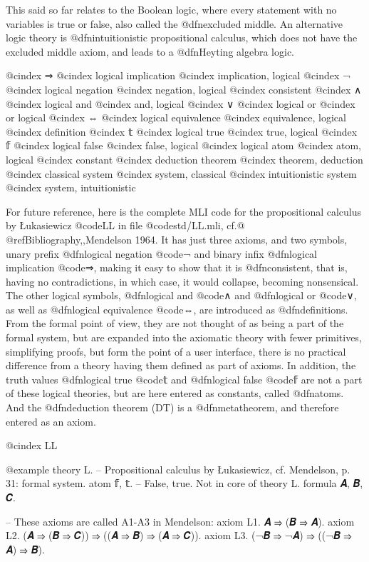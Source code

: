 This said so far relates to the Boolean logic, where every statement with no variables is true or false, also called the @dfn{excluded middle}. An alternative logic theory is @dfn{intuitionistic propositional calculus}, which does not have the excluded middle axiom, and leads to a @dfn{Heyting algebra} logic.


@cindex ⇒
@cindex logical implication
@cindex implication, logical
@cindex ¬
@cindex logical negation
@cindex negation, logical
@cindex consistent
@cindex ∧
@cindex logical and
@cindex and, logical
@cindex ∨
@cindex logical or
@cindex or logical
@cindex ⇔
@cindex logical equivalence
@cindex equivalence, logical
@cindex definition
@cindex 𝕥
@cindex logical true
@cindex true, logical
@cindex 𝕗
@cindex logical false
@cindex false, logical
@cindex logical atom
@cindex atom, logical
@cindex constant
@cindex deduction theorem
@cindex theorem, deduction
@cindex classical system
@cindex system, classical
@cindex intuitionistic system
@cindex system, intuitionistic


For future reference, here is the complete MLI code for the propositional calculus by Łukasiewicz @code{LL} in file @code{std/LL.mli}, cf.@ @ref{Bibliography,,Mendelson 1964}. It has just three axioms, and two symbols, unary prefix @dfn{logical negation} @code{¬} and binary infix @dfn{logical implication} @code{⇒}, making it easy to show that it is @dfn{consistent}, that is, having no contradictions, in which case, it would collapse, becoming nonsensical. The other logical symbols, @dfn{logical and} @code{∧} and @dfn{logical or} @code{∨}, as well as @dfn{logical equivalence} @code{⇔}, are introduced as @dfn{definitions}. From the formal point of view, they are not thought of as being a part of the formal system, but are expanded into the axiomatic theory with fewer primitives, simplifying proofs, but form the point of a user interface, there is no practical difference from a theory having them defined as part of axioms. In addition, the truth values @dfn{logical true} @code{𝕥} and @dfn{logical false} @code{𝕗} are not a part of these logical theories, but are here entered as constants, called @dfn{atoms}. And the @dfn{deduction theorem} (DT) is a @dfn{metatheorem}, and therefore entered as an axiom.

@cindex LL

@example
theory L. -- Propositional calculus by Łukasiewicz, cf. Mendelson, p. 31:
  formal system.
    atom 𝕗, 𝕥. -- False, true. Not in core of theory L.
    formula 𝑨, 𝑩, 𝑪.

  -- These axioms are called A1-A3 in Mendelson:
  axiom L1. 𝑨 ⇒ (𝑩 ⇒ 𝑨).
  axiom L2. (𝑨 ⇒ (𝑩 ⇒ 𝑪)) ⇒ ((𝑨 ⇒ 𝑩) ⇒ (𝑨 ⇒ 𝑪)).
  axiom L3. (¬𝑩 ⇒ ¬𝑨) ⇒ ((¬𝑩 ⇒ 𝑨) ⇒ 𝑩).

